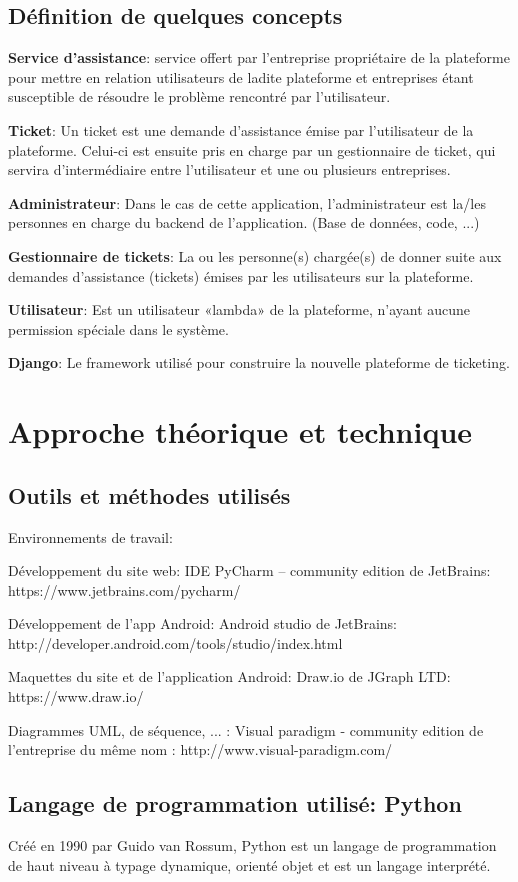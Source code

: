 \documentclass[12pt,table,a4paper]{report}
\begin{document}
\section{Définition de quelques concepts}
\textbf{Service d'assistance}: service offert par l'entreprise propriétaire de la plateforme pour mettre en relation utilisateurs de ladite plateforme et entreprises étant susceptible de résoudre le problème rencontré par l'utilisateur.

\textbf{Ticket}: Un ticket est une demande d'assistance émise par l'utilisateur de la plateforme. Celui-ci est ensuite pris en charge par un gestionnaire de ticket, qui servira d'intermédiaire entre l'utilisateur et une ou plusieurs entreprises.

\textbf{Administrateur}: Dans le cas de cette application, l'administrateur est la/les personnes en charge du backend de l'application. (Base de données, code, ...)

\textbf{Gestionnaire de tickets}: La ou les personne(s) chargée(s) de donner suite aux demandes d'assistance (tickets) émises par les utilisateurs sur la plateforme.

\textbf{Utilisateur}: Est un utilisateur «lambda» de la plateforme, n'ayant aucune permission spéciale dans le système.

\textbf{Django}: Le framework utilisé pour construire la nouvelle plateforme de ticketing.


\chapter{Approche théorique et technique}
\section{Outils et méthodes utilisés}
Environnements de travail:

Développement du site web: IDE PyCharm – community edition de JetBrains: https://www.jetbrains.com/pycharm/

Développement de l'app Android: Android studio de JetBrains: http://developer.android.com/tools/studio/index.html

Maquettes du site et de l'application Android: Draw.io de JGraph LTD: https://www.draw.io/

Diagrammes UML, de séquence, ... : Visual paradigm - community edition de l'entreprise du même nom : http://www.visual-paradigm.com/

\section{Langage de programmation utilisé: Python}
Créé en 1990 par Guido van Rossum, Python est un langage de programmation de haut niveau à typage dynamique, orienté objet et est un langage interprété.
\end{document}
